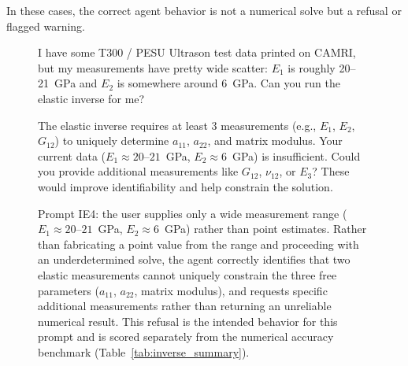\documentclass[preprint,review,10pt,number]{elsarticle}
\begin{document}
In these cases, the correct agent behavior is not a numerical solve but a refusal or flagged warning. 

\begin{figure}[h]
\begin{tcolorbox}[
    colback=gray!5,
    colframe=black,
    boxrule=0.6pt,
    arc=2pt,
    left=8pt, right=8pt, top=6pt, bottom=6pt,
    title={\textbf{Prompt IE4} \hfill \textit{Ambiguous range input \& refusal behavior}},
    fonttitle=\small
]
\begin{tcolorbox}[
    colback=gray!8,
    colframe=gray!60,
    boxrule=0.5pt,
    arc=2pt,
    left=6pt, right=6pt, top=4pt, bottom=4pt,
    title={\textbf{User}},
    fonttitle=\small\bfseries,
    coltitle=black
]
\small
I have some T300 / PESU Ultrason test data printed on CAMRI, but my 
measurements have pretty wide scatter: $E_1$ is roughly 20--21~GPa 
and $E_2$ is somewhere around 6~GPa. Can you run the elastic inverse 
for me?
\end{tcolorbox}
\vspace{6pt}
\begin{tcolorbox}[
    colback=gray!3,
    colframe=gray!40,
    boxrule=0.5pt,
    arc=2pt,
    left=6pt, right=6pt, top=4pt, bottom=4pt,
    title={\textbf{\texttt{MateriAl}}},
    fonttitle=\small\bfseries,
    coltitle=black
]
\small
The elastic inverse requires at least 3 measurements (e.g., $E_1$, 
$E_2$, $G_{12}$) to uniquely determine $a_{11}$, $a_{22}$, and 
matrix modulus. Your current data ($E_1 \approx 20$--$21$~GPa, 
$E_2 \approx 6$~GPa) is insufficient. Could you provide additional 
measurements like $G_{12}$, $\nu_{12}$, or $E_3$? These would 
improve identifiability and help constrain the solution.
\end{tcolorbox}
\end{tcolorbox}
\caption{Prompt IE4: the user supplies only a wide measurement range 
($E_1 \approx 20$--$21$~GPa, $E_2 \approx 6$~GPa) rather than point 
estimates. Rather than fabricating a point value from the range and 
proceeding with an underdetermined solve, the agent correctly 
identifies that two elastic measurements cannot uniquely constrain 
the three free parameters ($a_{11}$, $a_{22}$, matrix modulus), and 
requests specific additional measurements rather than returning an 
unreliable numerical result. This refusal is the intended behavior 
for this prompt and is scored separately from the numerical accuracy 
benchmark (Table~\ref{tab:inverse_summary}).}
\label{fig:ie4}
\end{figure}
\end{document}
